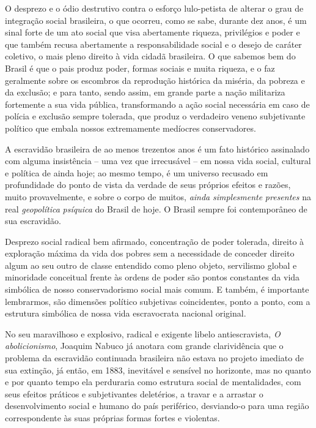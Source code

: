 O desprezo e o ódio destrutivo contra o esforço lulo-petista de alterar
o grau de integração social brasileira, o que ocorreu, como se sabe,
durante dez anos, é um sinal forte de um ato social que visa abertamente
riqueza, privilégios e poder e que também recusa abertamente a
responsabilidade social e o desejo de caráter coletivo, o mais pleno
direito à vida cidadã brasileira. O que sabemos bem do Brasil é que o
pais produz poder, formas sociais e muita riqueza, e o faz geralmente
sobre os escombros da reprodução histórica da miséria, da pobreza e da
exclusão; e para tanto, sendo assim, em grande parte a nação militariza
fortemente a sua vida pública, transformando a ação social necessária em
caso de polícia e exclusão sempre tolerada, que produz o verdadeiro
veneno subjetivante político que embala nossos extremamente medíocres
conservadores.

A escravidão brasileira de ao menos trezentos anos é um fato histórico
assinalado com alguma insistência -- uma vez que irrecusável -- em nossa
vida social, cultural e política de ainda hoje; ao mesmo tempo, é um
universo recusado em profundidade do ponto de vista da verdade de seus
próprios efeitos e razões, muito provavelmente, e sobre o corpo de
muitos, \emph{ainda} \emph{simplesmente} \emph{presentes} na real
\emph{geopolítica} \emph{psíquica} do Brasil de hoje. O Brasil sempre
foi contemporâneo de sua escravidão.

Desprezo social radical bem afirmado, concentração de poder tolerada,
direito à exploração máxima da vida dos pobres sem a necessidade de
conceder direito algum ao seu outro de classe entendido como pleno
objeto, servilismo global e minoridade conceitual frente às ordens de
poder são pontos constantes da vida simbólica de nosso conservadorismo
social mais comum. E também, é importante lembrarmos, são dimensões
político subjetivas coincidentes, ponto a ponto, com a estrutura
simbólica de nossa vida escravocrata nacional original.

No seu maravilhoso e explosivo, radical e exigente libelo
antiescravista, \emph{O abolicionismo}, Joaquim Nabuco já anotara com
grande clarividência que o problema da escravidão continuada brasileira
não estava no projeto imediato de sua extinção, já então, em 1883,
inevitável e sensível no horizonte, mas no quanto e por quanto tempo ela
perduraria como estrutura social de mentalidades, com seus efeitos
práticos e subjetivantes deletérios, a travar e a arrastar o
desenvolvimento social e humano do país periférico, desviando-o para uma
região correspondente às suas próprias formas fortes e violentas.

